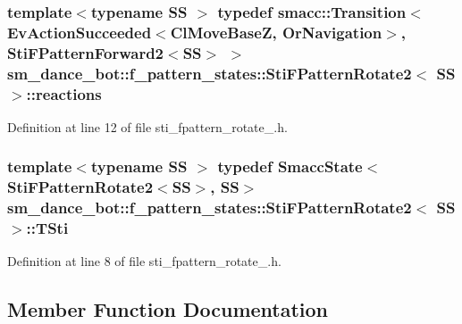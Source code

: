 \subsubsection[{\texorpdfstring{reactions}{reactions}}]{\setlength{\rightskip}{0pt plus 5cm}template$<$typename SS $>$ typedef {\bf smacc\+::\+Transition}$<$Ev\+Action\+Succeeded$<${\bf Cl\+Move\+BaseZ}, {\bf Or\+Navigation}$>$, {\bf Sti\+F\+Pattern\+Forward2}$<$SS$>$ $>$ {\bf sm\+\_\+dance\+\_\+bot\+::f\+\_\+pattern\+\_\+states\+::\+Sti\+F\+Pattern\+Rotate2}$<$ SS $>$\+::{\bf reactions}}\hypertarget{structsm__dance__bot_1_1f__pattern__states_1_1StiFPatternRotate2_ae5a931374c13aa2edb15371529d0af5a}{}\label{structsm__dance__bot_1_1f__pattern__states_1_1StiFPatternRotate2_ae5a931374c13aa2edb15371529d0af5a}


Definition at line 12 of file sti\+\_\+fpattern\+\_\+rotate\+\_.\+h.

\subsubsection[{\texorpdfstring{T\+Sti}{TSti}}]{\setlength{\rightskip}{0pt plus 5cm}template$<$typename SS $>$ typedef {\bf Smacc\+State}$<${\bf Sti\+F\+Pattern\+Rotate2}$<$SS$>$, SS$>$ {\bf sm\+\_\+dance\+\_\+bot\+::f\+\_\+pattern\+\_\+states\+::\+Sti\+F\+Pattern\+Rotate2}$<$ SS $>$\+::{\bf T\+Sti}}\hypertarget{structsm__dance__bot_1_1f__pattern__states_1_1StiFPatternRotate2_a38f721b63f2513b401cec57d938f7acf}{}\label{structsm__dance__bot_1_1f__pattern__states_1_1StiFPatternRotate2_a38f721b63f2513b401cec57d938f7acf}


Definition at line 8 of file sti\+\_\+fpattern\+\_\+rotate\+\_.\+h.



\subsection{Member Function Documentation}
